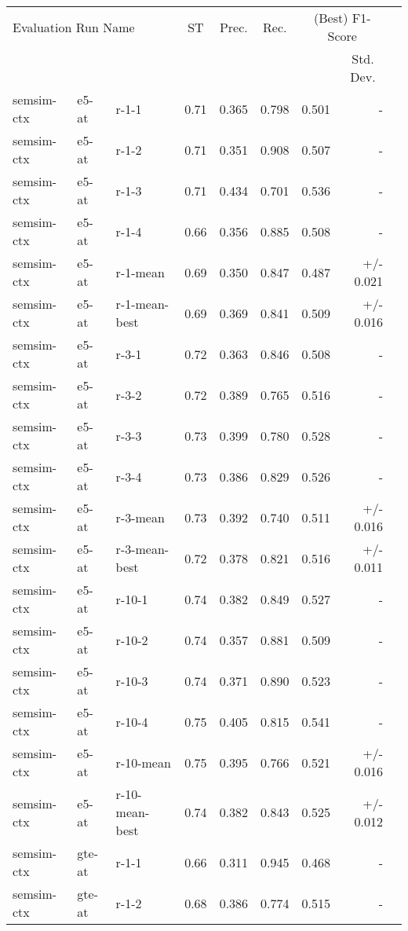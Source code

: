 \begin{table}[H]
\centering
\begin{tabular}{lllrrrrrr}
\toprule
\multicolumn{3}{l}{Evaluation Run Name}	& \multicolumn{1}{c}{ST} & \multicolumn{1}{c}{Prec.} & \multicolumn{1}{c}{Rec.} & \multicolumn{2}{c}{(Best) F1-Score}\\
\cmidrule{7-8}
\multicolumn{7}{l}{} & \multicolumn{1}{c}{Std. Dev.} \\
\midrule
semsim-ctx & e5-at & r-1-1 & 0.71 & 0.365 & 0.798 & 0.501 & - \\
semsim-ctx & e5-at & r-1-2 & 0.71 & 0.351 & 0.908 & 0.507 & - \\
semsim-ctx & e5-at & r-1-3 & 0.71 & 0.434 & 0.701 & 0.536 & - \\
semsim-ctx & e5-at & r-1-4 & 0.66 & 0.356 & 0.885 & 0.508 & - \\
semsim-ctx & e5-at & r-1-mean & 0.69 & 0.350 & 0.847 & 0.487 & +/- 0.021 \\
semsim-ctx & e5-at & r-1-mean-best & 0.69 & 0.369 & 0.841 & 0.509 & +/- 0.016 \\
\hline
semsim-ctx & e5-at & r-3-1 & 0.72 & 0.363 & 0.846 & 0.508 & - \\
semsim-ctx & e5-at & r-3-2 & 0.72 & 0.389 & 0.765 & 0.516 & - \\
semsim-ctx & e5-at & r-3-3 & 0.73 & 0.399 & 0.780 & 0.528 & - \\
semsim-ctx & e5-at & r-3-4 & 0.73 & 0.386 & 0.829 & 0.526 & - \\
semsim-ctx & e5-at & r-3-mean & 0.73 & 0.392 & 0.740 & 0.511 & +/- 0.016 \\
semsim-ctx & e5-at & r-3-mean-best & 0.72 & 0.378 & 0.821 & 0.516 & +/- 0.011 \\
\hline
semsim-ctx & e5-at & r-10-1 & 0.74 & 0.382 & 0.849 & 0.527 & - \\
semsim-ctx & e5-at & r-10-2 & 0.74 & 0.357 & 0.881 & 0.509 & - \\
semsim-ctx & e5-at & r-10-3 & 0.74 & 0.371 & 0.890 & 0.523 & - \\
semsim-ctx & e5-at & r-10-4 & 0.75 & 0.405 & 0.815 & 0.541 & - \\
semsim-ctx & e5-at & r-10-mean & 0.75 & 0.395 & 0.766 & 0.521 & +/- 0.016 \\
semsim-ctx & e5-at & r-10-mean-best & 0.74 & 0.382 & 0.843 & 0.525 & +/- 0.012 \\
\hline
semsim-ctx & gte-at & r-1-1 & 0.66 & 0.311 & 0.945 & 0.468 & - \\
semsim-ctx & gte-at & r-1-2 & 0.68 & 0.386 & 0.774 & 0.515 & - \\

\end{tabular}
\end{table}
